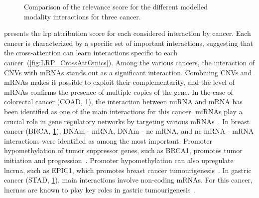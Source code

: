 \documentclass[../main.tex]{subfiles}
\begin{document}
\begin{figure}
			\caption[Comparison of the  relevance scores]{Comparison of the  relevance score for the different modelled modality interactions for three cancer.}\label{fig:LRP_CrossAttOmics_subset}
		\end{figure}
		 presents the \gls{lrp} attribution score for each considered interaction by cancer.
		Each cancer is characterized by a specific set of important interactions, suggesting that the cross-attention can learn interactions specific to each cancer~(\cref{fig:LRP_CrossAttOmics}).
		Among the various cancers, the interaction of CNVs with mRNAs stands out as a significant interaction.
		Combining CNVs and mRNAs makes it possible to exploit their complementarity, and the level of mRNAs confirms the presence of multiple copies of the gene.
		In the case of colorectal cancer (COAD, \cref{fig:LRP_CrossAttOmics_subset}),  the interaction between miRNA and mRNA has been identified as one of the main interactions for this cancer.
		miRNAs play a crucial role in gene regulatory networks by targeting various mRNAs~\cite{Amirkhah2015}.
		In breast cancer (BRCA, \cref{fig:LRP_CrossAttOmics_subset}), DNAm - mRNA, DNAm - nc mRNA, and nc mRNA - mRNA interactions were identified as among the most important.
		Promoter hypomethylation of tumor suppressor genes, such as BRCA1, promotes tumor initiation and progression~\cite{Szyf2004}.
		Promoter hypomethylation can also upregulate \gls{lncrna}, such as EPIC1, which promotes breast cancer tumourigenesis~\cite{Wang2018}.
		In gastric cancer (STAD, \cref{fig:LRP_CrossAttOmics_subset}), main interactions involve non-coding mRNAs.
		For this cancer, \glspl{lncrna} are known to play key roles in gastric tumourigenesis~\cite{Tan2020}.
\end{document}
